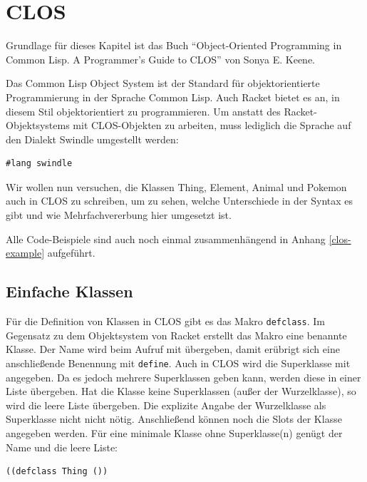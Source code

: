 \section{CLOS}
Grundlage für dieses Kapitel ist das Buch ``Object-Oriented Programming in Common Lisp. A Programmer's Guide to CLOS''\cite{keene} von Sonya E. Keene. 

Das Common Lisp Object System ist der Standard für objektorientierte Programmierung in der Sprache Common Lisp. Auch Racket bietet es an, in diesem Stil objektorientiert zu programmieren. Um anstatt des Racket-Objektsystems mit CLOS-Objekten zu arbeiten, muss lediglich die Sprache auf den Dialekt Swindle umgestellt werden:


\begin{lstlisting}
#lang swindle
\end{lstlisting}

Wir wollen nun versuchen, die Klassen Thing, Element, Animal und Pokemon auch in CLOS zu schreiben, um zu sehen, welche Unterschiede in der Syntax es gibt und wie Mehrfachvererbung hier umgesetzt ist. 

Alle Code-Beispiele sind auch noch einmal zusammenhängend in Anhang \ref{clos-example} aufgeführt.

\subsection{Einfache Klassen}
Für die Definition von Klassen in CLOS gibt es das Makro \texttt{defclass}. Im Gegensatz zu dem Objektsystem von Racket erstellt das Makro eine benannte Klasse. Der Name wird beim Aufruf mit übergeben, damit erübrigt sich eine anschließende Benennung mit \texttt{define}. Auch in CLOS wird die Superklasse mit angegeben. Da es jedoch mehrere Superklassen geben kann, werden diese in einer Liste übergeben. Hat die Klasse keine Superklassen (außer der Wurzelklasse), so wird die leere Liste übergeben. Die explizite Angabe der Wurzelklasse als Superklasse nicht nicht nötig. Anschließend können noch die Slots der Klasse angegeben werden. Für eine minimale Klasse ohne Superklasse(n) genügt der Name und die leere Liste: 

\begin{lstlisting}
((defclass Thing ())
\end{lstlisting}



